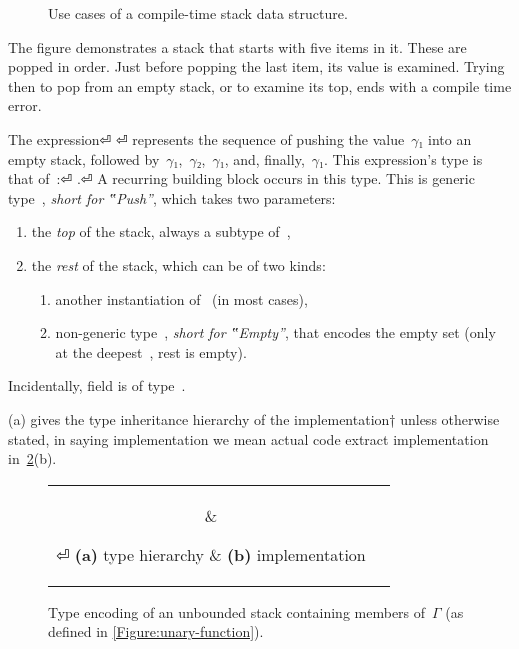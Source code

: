 \begin{figure}[htb]
  \caption{\label{Figure:stack-use-cases}%
    Use cases of a compile-time stack data structure.
  }
\end{figure}

The figure demonstrates a stack that starts with five items in it.
These are popped in order. Just before popping the last item, its
  value is examined.
Trying then to pop from an empty stack, or to examine its top, ends with
  a compile time error.

The expression⏎
  \mbox{\qquad\qquad} ⏎
represents the sequence of pushing the value~$γ₁$ into an
empty stack, followed by~$γ₁$,~$γ₂$,~$γ₁$, and, finally,~$γ₁$.
This expression's type is that of~:⏎
\mbox{\qquad\qquad} .⏎
A recurring building block occurs in this type.
This is generic type~, \emph{short for ‟Push”}, which takes two parameters:
  \begin{enumerate}
    \item the \emph{top} of the stack, always a subtype of~,
    \item the \emph{rest} of the stack, which can be of two kinds:
          \begin{enumerate}
            \item another instantiation of~ (in most cases),
            \item non-generic type~, \emph{short for ‟Empty”}, that encodes the empty
                  set (only at the deepest~, rest is empty).
          \end{enumerate}
  \end{enumerate}
Incidentally,  field  is of type~.

(a) gives the type inheritance hierarchy of the \Java
implementation†{%
  unless otherwise stated, in saying implementation we mean actual
  code extract
}
implementation in~\cref{Figure:stack-encoding}(b).

\begin{figure}[htb]
  \caption{\label{Figure:stack-encoding} Type encoding of an unbounded
  stack containing members of~$Γ$ (as defined in \cref{Figure:unary-function}).}
    \begin{tabular}{cc}
      \parbox[c]{0.3\linewidth}{%
        
      }
      &
      \hspace{-3ex}
      \parbox[c]{63ex}{}⏎
      \textbf{(a)} type hierarchy & \textbf{(b)} implementation
    \end{tabular}
\end{figure}

